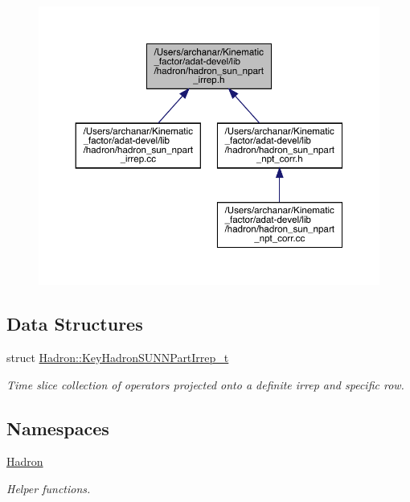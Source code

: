 \begin{figure}[H]
\begin{center}
\leavevmode
\includegraphics[width=350pt]{dd/d98/adat-devel_2lib_2hadron_2hadron__sun__npart__irrep_8h__dep__incl}
\end{center}
\end{figure}
\subsection*{Data Structures}
\begin{DoxyCompactItemize}
\item 
struct \mbox{\hyperlink{structHadron_1_1KeyHadronSUNNPartIrrep__t}{Hadron\+::\+Key\+Hadron\+S\+U\+N\+N\+Part\+Irrep\+\_\+t}}
\begin{DoxyCompactList}\small\item\em Time slice collection of operators projected onto a definite irrep and specific row. \end{DoxyCompactList}\end{DoxyCompactItemize}
\subsection*{Namespaces}
\begin{DoxyCompactItemize}
\item 
 \mbox{\hyperlink{namespaceHadron}{Hadron}}
\begin{DoxyCompactList}\small\item\em Helper functions. \end{DoxyCompactList}\end{DoxyCompactItemize}
